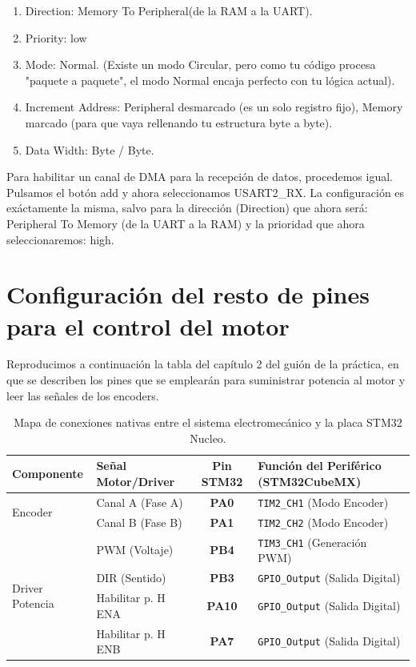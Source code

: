 \begin{enumerate}
\item Direction:  Memory To Peripheral(de la RAM a la UART).

\item Priority: low
\item Mode: Normal. (Existe un modo Circular, pero como tu código procesa "paquete a paquete", el modo Normal encaja perfecto con tu lógica actual).

\item Increment Address: Peripheral desmarcado (es un solo registro fijo), Memory marcado (para que vaya rellenando tu estructura byte a byte).

\item Data Width: Byte / Byte.
\end{enumerate}

Para habilitar un canal de DMA para la recepción de datos, procedemos igual. Pulsamos el botón add y ahora seleccionamos USART2\_RX. La configuración es exáctamente la misma, salvo para la dirección (Direction) que ahora será: Peripheral To Memory (de la UART a la RAM) y la prioridad que ahora seleccionaremos: high.



\section{Configuración del resto de pines para el control del motor}
Reproducimos a continuación la tabla del capítulo 2 del guión de la práctica, en que se describen los pines que se emplearán para suministrar potencia al motor y leer las señales de los encoders.

\begin{table}[h]
	\centering
	\begin{tabular}{|l|l|c|p{7.5cm}|}
		\hline
		\textbf{Componente} & \textbf{Señal Motor/Driver} & \textbf{Pin STM32} & \textbf{Función del Periférico (STM32CubeMX)} \\ \hline
		\multirow{2}{*}{Encoder} 
		& Canal A (Fase A) & \textbf{PA0} & \texttt{TIM2\_CH1} (Modo Encoder) \\ \cline{2-4} 
		& Canal B (Fase B) & \textbf{PA1} & \texttt{TIM2\_CH2} (Modo Encoder) \\ \hline
		\multirow{4}{*}{Driver Potencia} 
		& PWM (Voltaje) & \textbf{PB4} & \texttt{TIM3\_CH1} (Generación PWM) \\ \cline{2-4} 
		& DIR (Sentido)   & \textbf{PB3} & \texttt{GPIO\_Output} (Salida Digital) \\ \cline{2-4} 
		&Habilitar p. H ENA & \textbf{PA10} & \texttt{GPIO\_Output} (Salida Digital) \\ \cline{2-4} 
		&Habilitar p. H ENB & \textbf{PA7} & \texttt{GPIO\_Output} (Salida Digital) \\
		\hline
	\end{tabular}
	\caption{Mapa de conexiones nativas entre el sistema electromecánico y la placa STM32 Nucleo.}
	\label{tab:pines}
\end{table}

